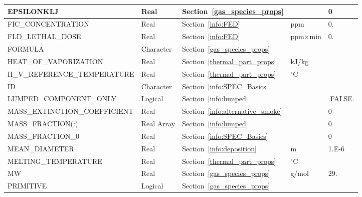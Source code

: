 \documentclass[11pt]{book}
\begin{document}
\begin{longtable}{@{\extracolsep{\fill}}|l|l|l|l|l|}
{\ct EPSILONKLJ}                    & Real        & Section~\ref{gas_species_props}         &                   & 0             \\ \hline
{\ct FIC\_CONCENTRATION}            & Real        & Section~\ref{info:FED}                  & ppm               & 0.            \\ \hline
{\ct FLD\_LETHAL\_DOSE}             & Real        & Section~\ref{info:FED}                  & ppm$\times$min    & 0.            \\ \hline
{\ct FORMULA }                      & Character   & Section~\ref{gas_species_props}         &                   &               \\ \hline
{\ct HEAT\_OF\_VAPORIZATION}        & Real        & Section~\ref{thermal_part_props}        & kJ/kg             &               \\ \hline
{\ct H\_V\_REFERENCE\_TEMPERATURE}  & Real        & Section~\ref{thermal_part_props}        & $^\circ$C         &               \\ \hline
{\ct ID }                           & Character   & Section~\ref{info:SPEC_Basics}          &                   &               \\ \hline
{\ct LUMPED\_COMPONENT\_ONLY}       & Logical     & Section~\ref{info:lumped}               &                   & {\ct .FALSE.} \\ \hline
{\ct MASS\_EXTINCTION\_COEFFICIENT} & Real        & Section~\ref{info:alternative_smoke}    &                   & 0             \\ \hline
{\ct MASS\_FRACTION(:)}             & Real Array  & Section~\ref{info:lumped}               &                   & 0             \\ \hline
{\ct MASS\_FRACTION\_0}             & Real        & Section~\ref{info:SPEC_Basics}          &                   & 0             \\ \hline
{\ct MEAN\_DIAMETER}                & Real        & Section~\ref{info:deposition}           & m                 & 1.E-6         \\ \hline
{\ct MELTING\_TEMPERATURE}          & Real        & Section~\ref{thermal_part_props}        & $^\circ$C         &               \\ \hline
{\ct MW}                            & Real        & Section~\ref{gas_species_props}         & g/mol             & 29.           \\ \hline
{\ct PRIMITIVE}                     & Logical     & Section~\ref{gas_species_props}         &                   &               \\ \hline

\end{longtable}
\end{document}
